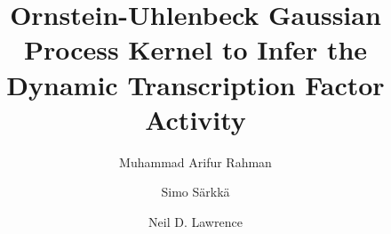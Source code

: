 \usepackage{subcaption}

\usepackage{booktabs} %
\usepackage{multirow}




\usepackage{amsfonts}
\usepackage{amsmath}
\usepackage{amssymb}
\usepackage{siunitx} %

\usepackage{flexisym}
\usepackage{pdfpages}
\usepackage{epstopdf}
\usepackage{epsfig}

\usepackage{changepage}%
\usepackage{lipsum}%

\usepackage{acronym}

\usepackage{tabulary}
\usepackage{tabularx}
\usepackage{makecell}
\usepackage{rotating}

\usepackage{stackengine}
\usepackage{url}
\usepackage{cite}
\usepackage{balance}

\renewcommand{\dateseparator}{--}
%
%





\title{Ornstein-Uhlenbeck Gaussian Process Kernel to Infer the Dynamic Transcription Factor Activity}
\author{Muhammad Arifur Rahman
    \and Simo S\"arkk\"a
    \and Neil D. Lawrence}


